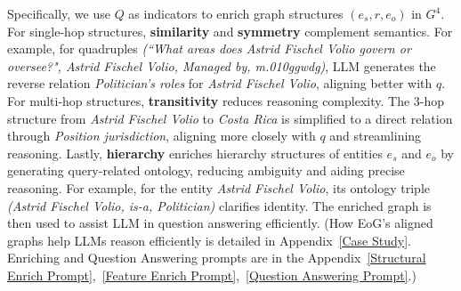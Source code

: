 \documentclass[11pt]{article}
\begin{document}
Specifically, we use $Q$ as indicators to enrich graph structures $(e_s, r, e_o)$ in $G^4$.
For single-hop structures, \textbf{similarity} and \textbf{symmetry} complement semantics. For example, for quadruples \textit{(``What areas does Astrid Fischel Volio govern or oversee?", Astrid Fischel Volio, Managed by, m.010ggwdg)}, LLM generates the reverse relation \textit{Politician's roles} for \textit{Astrid Fischel Volio}, aligning better with $q$.
For multi-hop structures, \textbf{transitivity} reduces reasoning complexity. The 3-hop structure from \textit{Astrid Fischel Volio} to \textit{Costa Rica} is simplified to a direct relation through \textit{Position jurisdiction}, aligning more closely with $q$ and streamlining reasoning.
Lastly, \textbf{hierarchy} enriches hierarchy structures of entities $ e_s $ and $ e_o $ by generating query-related ontology, reducing ambiguity and aiding precise reasoning. For example, for the entity \textit{Astrid Fischel Volio}, its ontology triple \textit{(Astrid Fischel Volio, is-a, Politician)} clarifies identity. The enriched graph is then used to assist LLM in question answering efficiently. 
(How EoG's aligned graphs help LLMs reason efficiently is detailed in Appendix~\ref{Case Study}. Enriching and Question Answering prompts are in the Appendix~\ref{Structural Enrich Prompt},~\ref{Feature Enrich Prompt},~\ref{Question Answering Prompt}.)
\end{document}
